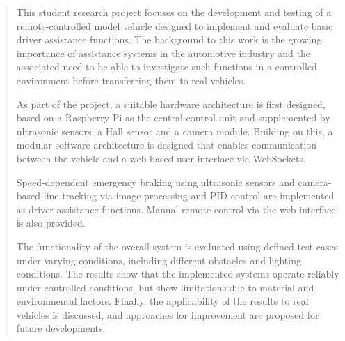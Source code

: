 \renewcommand{\abstractname}{Abstract}
\begin{abstract}
    This student research project focuses on the development and testing of a remote-controlled model vehicle designed to implement and evaluate basic driver assistance functions. The background to this work is the growing importance of assistance systems in the automotive industry and the associated need to be able to investigate such functions in a controlled environment before transferring them to real vehicles.

    As part of the project, a suitable hardware architecture is first designed, based on a Raspberry Pi as the central control unit and supplemented by ultrasonic sensors, a Hall sensor and a camera module. Building on this, a modular software architecture is designed that enables communication between the vehicle and a web-based user interface via WebSockets.

    Speed-dependent emergency braking using ultrasonic sensors and camera-based line tracking via image processing and PID control are implemented as driver assistance functions. Manual remote control via the web interface is also provided.

    The functionality of the overall system is evaluated using defined test cases under varying conditions, including different obstacles and lighting conditions. The results show that the implemented systems operate reliably under controlled conditions, but show limitations due to material and environmental factors. Finally, the applicability of the results to real vehicles is discussed, and approaches for improvement are proposed for future developments.
\end{abstract}